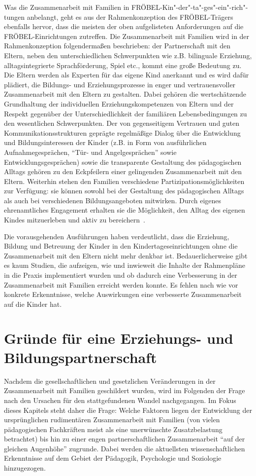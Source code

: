 \documentclass[12pt,a4paper]{article}
\begin{document}
Was die Zusammenarbeit mit Familien in FRÖBEL-Kin"-der"-ta"-ges"-ein"-rich"-tungen anbelangt, geht es aus der Rahmenkonzeption des FRÖBEL-Trägers ebenfalls hervor, dass die meisten der oben aufgelisteten Anforderungen auf die FRÖBEL-Einrichtungen zutreffen. Die Zusammenarbeit mit Familien wird in der Rahmenkonzeption folgendermaßen beschrieben: der Partnerschaft mit den Eltern, neben den unterschiedlichen Schwerpunkten wie z.B. bilinguale Erziehung, alltagsintegrierte Sprachförderung, Spiel etc., kommt eine große Bedeutung zu. Die Eltern werden als Experten für das eigene Kind anerkannt und es wird dafür plädiert, die Bildungs- und Erziehungsprozesse in enger und vertrauensvoller Zusammenarbeit mit den Eltern zu gestalten. Dabei gehören die wertschätzende Grundhaltung der individuellen Erziehungskompetenzen von Eltern und der Respekt gegenüber der Unterschiedlichkeit der familiären Lebensbedingungen zu den wesentlichen Schwerpunkten. Der von gegenseitigem Vertrauen und guten Kommunikationsstrukturen geprägte regelmäßige Dialog über die Entwicklung und Bildungsinteressen der Kinder (z.B. in Form von ausführlichen Aufnahmegesprächen, "`Tür- und Angelgesprächen"' sowie Entwicklungsgesprächen) sowie die transparente Gestaltung des pädagogischen Alltags gehören zu den Eckpfeilern einer gelingenden Zusammenarbeit mit den Eltern. Weiterhin stehen den Familien verschiedene Partizipationsmöglichkeiten zur Verfügung: sie können sowohl bei der Gestaltung des pädagogischen Alltags als auch bei verschiedenen Bildungsangeboten mitwirken. Durch eigenes ehrenamtliches Engagement erhalten sie die Möglichkeit, den Alltag des eigenen Kindes mitzuerleben und aktiv zu bereichern~\parencite[S.~25-28]{Kieschnick}.

	Die vorausgehenden Ausführungen haben verdeutlicht, dass die Erziehung, Bildung und Betreuung der Kinder in den Kindertageseinrichtungen ohne die Zusammenarbeit mit den Eltern nicht mehr denkbar ist. Bedauerlicherweise gibt es kaum Studien, die aufzeigen, wie und inwieweit die Inhalte der Rahmenpläne in die Praxis implementiert wurden und ob dadurch eine Verbesserung in der Zusammenarbeit mit Familien erreicht werden konnte. Es fehlen nach wie vor konkrete Erkenntnisse, welche Auswirkungen eine verbesserte Zusammenarbeit auf die Kinder hat.

\section{Gründe für eine Erziehungs- und Bildungspartnerschaft}
Nachdem die gesellschaftlichen und gesetzlichen Veränderungen in der Zusammenarbeit mit Familien geschildert wurden, wird im Folgenden der Frage nach den Ursachen für den stattgefundenen Wandel nachgegangen. Im Fokus dieses Kapitels steht daher die Frage: Welche Faktoren liegen der Entwicklung der ursprünglichen rudimentären Zusammenarbeit mit Familien (von vielen pädagogischen Fachkräften meist als eine unerwünschte Zusatzbelastung betrachtet) bis hin zu einer engen partnerschaftlichen Zusammenarbeit "`auf der gleichen Augenhöhe"' zugrunde. Dabei werden die aktuellsten wissenschaftlichen Erkenntnisse auf dem Gebiet der Pädagogik, Psychologie und Soziologie hinzugezogen.
\end{document}
